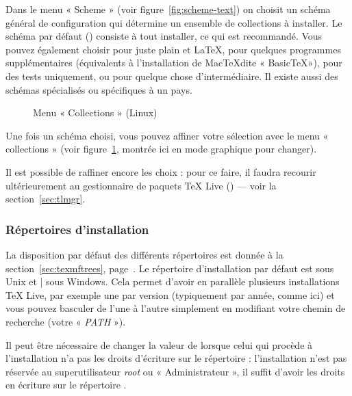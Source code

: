\documentclass[german, english, french]{article}
\renewcommand{\TL}{\TeX{} Live\xspace}%
\newcommand\eng[1]{\foreignlanguage{english}{\emph{#1}}}
\begin{document}
Dans le menu « Scheme » (voir figure~\ref{fig:scheme-text}) on choisit un schéma
général de configuration qui détermine un ensemble de collections à installer.
Le schéma par défaut () consiste à tout installer, ce qui est
recommandé. Vous pouvez également choisir  pour juste plain et
\LaTeX{},  pour quelques programmes supplémentaires (équivalents
à l'installation de Mac\TeX dite « Basic\TeX »),  pour des
tests uniquement,  ou  pour quelque chose
d'intermédiaire. Il existe aussi des schémas spécialisés ou spécifiques à un
pays.

\begin{figure}[tb]
  \def\figdesc{Menu « Collections »}
  \centering \tlpng{stdcoll}{.7\linewidth}{\figdesc}
  \caption{Menu « Collections » (Linux)}\label{fig:collections-gui}
\end{figure}

Une fois un schéma choisi, vous pouvez affiner votre sélection avec le menu
« collections » (voir figure~\ref{fig:collections-gui}, montrée ici en mode
graphique pour changer).

Il est possible de raffiner encore les choix : pour ce faire, il faudra recourir
ultérieurement au gestionnaire de paquets \TL{} () --- voir la
section~\ref{sec:tlmgr}.

\subsubsection{Répertoires d'installation}
\label{sec:directories}

La disposition par défaut des différents répertoires est donnée à la
section~\ref{sec:texmftrees}, page~\pageref{sec:texmftrees}.  Le répertoire
d'installation par défaut est  sous Unix et
|%
sous Windows. Cela permet d'avoir en parallèle plusieurs installations \TL{},
par exemple une par version (typiquement par année, comme ici) et vous pouvez
basculer de l'une à l'autre simplement en modifiant votre chemin de recherche
(votre « \emph{PATH} »).

Il peut être nécessaire de changer la valeur de  lorsque celui
qui procède à l'installation n'a pas les droits d'écriture sur le répertoire
 : l'installation n'est pas réservée au superutilisateur
\eng{root} ou « Administrateur », il suffit d'avoir les droits en écriture sur
le répertoire .
\end{document}
